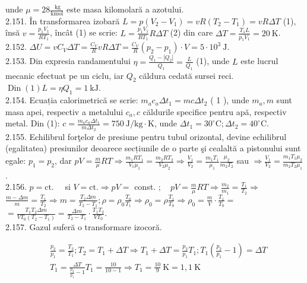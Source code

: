 unde $\mu=28 \frac{\mathrm{~kg}}{\mathrm{kmol}}$ este masa kilomolară a azotului.\\
2.151. În transformarea izobară $L=p\left(V_{2}-V_{1}\right)=v R\left(T_{2}-T_{1}\right)=v R \Delta T$ (1), însă $v=\frac{p_{1} V_{1}}{R T_{1}}$, încât (1) se scrie: $L=\frac{p_{1} V_{1}}{R T_{1}} R \Delta T$ (2) din care $\Delta T=\frac{T_{1} L}{p_{1} V_{1}}=20 \mathrm{~K}$.\\
2.152. $\Delta U=v C_{V} \Delta T=\frac{C_{V}}{R} v R \Delta T=\frac{C_{V}}{R}\left(p_{2}-p_{1}\right) \cdot V=5 \cdot 10^{3} \mathrm{~J}$.\\
2.153. Din expresia randamentului $\eta=\frac{Q_{1}-\left|Q_{2}\right|}{Q_{1}}=\frac{L}{Q_{1}}$ (1), unde $L$ este lucrul mecanic efectuat pe un ciclu, iar $Q_{2}$ căldura cedată sursei reci.\\
$\operatorname{Din}(1) L=\eta Q_{1}=1 \mathrm{~kJ}$.\\
2.154. Ecuația calorimetrică se scrie: $m_{a} c_{a} \Delta t_{1}=m c \Delta t_{2}$ ( 1 ), unde $m_{a}, m$ sunt masa apei, respectiv a metalului $c_{a}, c$ căldurile specifice pentru apă, respectiv metal. Din (1): $c=\frac{m_{a} c_{a} \Delta t_{1}}{m \Delta t_{2}}=750 \mathrm{~J} / \mathrm{kg} \cdot \mathrm{K}$, unde $\Delta t_{1}=30^{\circ} \mathrm{C} ; \Delta t_{2}=40^{\circ} \mathrm{C}$.\\
2.155. Echilibrul forţelor de presiune pentru tubul orizontal, devine echilibrul (egalitatea) presiunilor deoarece secțiunile de o parte şi cealaltă a pistonului sunt egale: $p_{1}=p_{2}$, dar $p V=\frac{m}{\mu} R T \Rightarrow \frac{m_{1} R T_{1}}{V_{1} \mu_{1}}=\frac{m_{2} R T_{2}}{V_{2} \mu_{2}} \Rightarrow \frac{V_{1}}{V_{2}}=\frac{m_{1} T_{1}}{\mu_{1}} \frac{\mu_{2}}{m_{2} T_{2}}$ sau $\Rightarrow \frac{V_{1}}{V_{2}}=\frac{m_{1} T_{1} \mu_{2}}{m_{2} T_{2} \mu_{1}}$.\\
2.156. $p=\mathrm{ct} . \quad$ si $V=\mathrm{ct} . \Rightarrow p V=$ const. $; \quad p V=\frac{m}{\mu} R T \Rightarrow \frac{m_{2}}{m_{1}}=\frac{T_{1}}{T_{2}} \Rightarrow$ $\frac{m-\Delta m}{m}=\frac{T_{1}}{T_{2}} \Rightarrow m=\frac{T_{2} \Delta m}{T_{2}-T_{1}} ; \rho=\rho_{0} \frac{T_{0}}{T_{1}} \Rightarrow \rho_{0}=\rho \frac{T_{1}}{T_{0}} \Rightarrow \rho_{0}=\frac{m}{V} \cdot \frac{T_{1}}{T_{0}}=$ $=\frac{T_{1} T_{2} \Delta m}{V T_{0}\left(T_{2}-T_{1}\right)}=\frac{\Delta m}{T_{2}-T_{1}} \cdot \frac{T_{1} T_{2}}{V T_{0}}$.\\
2.157. Gazul suferă o transformare izocoră.

$$
\begin{aligned}
& \frac{p_{2}}{p_{1}}=\frac{T_{2}}{T_{1}} ; T_{2}=T_{1}+\Delta T \Rightarrow T_{1}+\Delta T=\frac{p_{2}}{p_{1}} T_{1} ; T_{1}\left(\frac{p_{2}}{p_{1}}-1\right)=\Delta T \\
& T_{1}=\frac{\Delta T}{\frac{p_{2}}{p_{1}}-1} T_{1}=\frac{10}{10-1} \Rightarrow T_{1}=\frac{10}{9} \mathrm{~K}=1,1 \mathrm{~K}
\end{aligned}
$$

